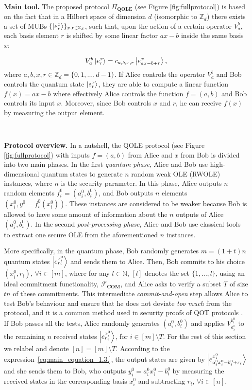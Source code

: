 \

\noindent\textbf{Main tool.} The proposed protocol $\Pi_{\textbf{QOLE}}$ (see Figure \ref{fig:fullprotocol}) is based on the fact that in a Hilbert space of dimension $d$ (isomorphic to $\mathbb{Z}_d$) there exists a set of MUBs $\{\ket{e^x_r}\}_{x, r\in\mathbb{Z}_d}$, such that, upon the action of a certain operator $V^b_a$,  each basis element $r$ is shifted by some linear factor $ax - b$ inside the same basis $x$:

\begin{equation}
    V^b_a \ket{e^x_r} = c_{a,b,x, r} \ket{e^x_{ax - b + r}},
    \label{eq:main_equation_1.3.}
\end{equation}
where $a, b, x, r \in \mathbb{Z}_d =\{0,1,\ldots,d-1\}$. If Alice controls the operator $V^b_a$ and Bob controls the quantum state $\ket{e^x_r}$, they are able to compute a linear function $f(x) = ax - b$ where effectively Alice controls the function $f = (a, b)$ and Bob controls its input $x$. Moreover, since Bob controls $x$ and $r$, he can receive $f(x)$ by measuring the output element. 

\

\noindent\textbf{Protocol overview.} In a nutshell, the QOLE protocol (see Figure \ref{fig:fullprotocol}) with inputs $f = (a,b)$ from Alice and $x$ from Bob is divided into two main phases. In the first \textit{quantum phase}, Alice and Bob use high-dimensional quantum states to generate $n$ random weak OLE (RWOLE) instances, where $n$ is the security parameter.  In this phase, Alice  outputs  $n$ random elements $f^0_i = (a^0_i, b^0_i)$, and Bob  outputs $n$ elements $(x^0_i, y^0 = f^0_i(x^0_i))$. These instances are considered to be weaker because Bob is allowed to have some amount of information about the $n$ outputs of Alice $(a^0_i, b^0_i)$. In the second \textit{post-processing phase}, Alice and Bob use classical tools to extract one secure OLE from the aforementioned $n$ instances.

More specifically, in the quantum phase, Bob randomly generates $m=(1 + t)n$ quantum states $\ket{e^{x^0_i}_{r_i}}$ and sends them to Alice. Then, Bob commits to his choice $(x^0_i, r_i)$, $\forall i\in [m]$, where for any $l\in\mathbb{N}$, $[l]$ denotes the set $\{1, \ldots, l\}$, using an ideal commitment functionality, $\mathcal{F}_{\textbf{COM}}$, and Alice asks to verify  a subset $T$ of size $tn$ of these commitments. This intermediate \textit{commit-and-open} step allows Alice to test Bob's behaviour and ensure that he does not deviate \textit{too much} from the protocol, and it is a common method used in security proofs of QOT protocols \cite{Unruh10, DFLSS09}. If Bob passes all the tests, Alice randomly generates $(a^0_i, b^0_i)$ and applies $V^{b^0_i}_{a^0_i}$ to the remaining $n$ received states $\ket{e^{x^0_i}_{r_i}}$,  for $i\in [m]\setminus T$.  For the rest of this section we relabel and denote $[n]=[m]\setminus T$. According to the expression~\eqref{eq:main_equation_1.3.}, the output states are given by $\ket{e^{x^0_i}_{a^0_i x^0_i - b^0_i + r_i}}$ and she sends them to Bob, who outputs $y^0_i = a^0_i x^0_i - b^0_i$ by measuring the received states in the corresponding basis $ x^0_i$ and subtracting $r_i$,  $\forall i\in [n]$. 

